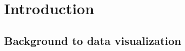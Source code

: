 \documentclass[11pt,a4paper,oldfontcommands,openany]{memoir}
\numberwithin{equation}{section} %
\newcommand{\code}[1]{{\texttt{#1}}}
\begin{document}
\sloppy


% 
% 
% 
% 
% 
% 
% 
% 
% 
% 
% 
% 
% 
% 
% 
% 
% 
% 
% 
% 
% 

\setsecheadstyle{\Large\bfseries\sffamily\raggedright}
\setsubsecheadstyle{\large\bfseries\sffamily\raggedright}
\setsubsubsecheadstyle{\bfseries\sffamily\raggedright}


\setlength{\parskip}{10pt} %

\OnehalfSpacing

\chapter{Introduction}
\section{Background to data visualization}

\citealt{ped}

\end{document}
